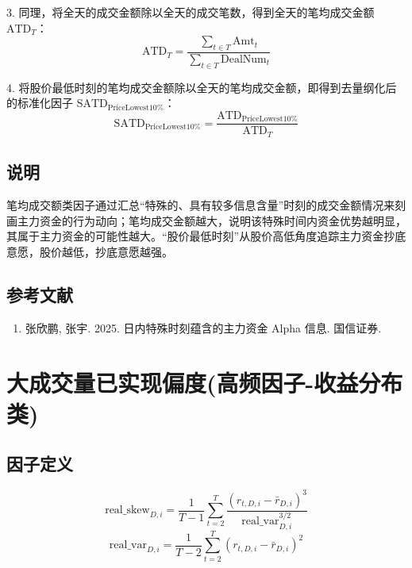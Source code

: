 \documentclass{article}
\begin{document}
3. 同理，将全天的成交金额除以全天的成交笔数，得到全天的笔均成交金额 \( \mathrm{ATD}_T \)：
\begin{equation}
    \mathrm{ATD}_T = \frac{\sum_{t \in T} \mathrm{Amt}_t}{\sum_{t \in T} \mathrm{DealNum}_t}
\end{equation}

4. 将股价最低时刻的笔均成交金额除以全天的笔均成交金额，即得到去量纲化后的标准化因子 \( \mathrm{SATD}_{\mathrm{PriceLowest10\%}} \)：
\begin{equation}
    \mathrm{SATD}_{\mathrm{PriceLowest10\%}} = \frac{\mathrm{ATD}_{\mathrm{PriceLowest10\%}}}{\mathrm{ATD}_T}
\end{equation}

\subsection{说明}
笔均成交额类因子通过汇总“特殊的、具有较多信息含量”时刻的成交金额情况来刻画主力资金的行为动向；笔均成交金额越大，说明该特殊时间内资金优势越明显，其属于主力资金的可能性越大。“股价最低时刻”从股价高低角度追踪主力资金抄底意愿，股价越低，抄底意愿越强。

\subsection{参考文献}
\begin{enumerate}
    \item 张欣鹏, 张宇. 2025. 日内特殊时刻蕴含的主力资金 Alpha 信息. 国信证券.
\end{enumerate}

\section{大成交量已实现偏度(高频因子-收益分布类)}

\subsection{因子定义}
\begin{equation}
    \mathrm{real\_skew}_{D,i} = \frac{1}{T-1}\sum_{t=2}^{T}\frac{  \left( r_{t,D,i} - \bar{r}_{D,i} \right)^3}{\mathrm{real\_var}_{D,i}^{3/2}}
\end{equation}
\begin{equation}
    \mathrm{real\_var}_{D,i} = \frac{1}{T-2} \sum_{t=2}^{T} \left( r_{t,D,i} - \bar{r}_{D,i} \right)^2
\end{equation}
\end{document}

